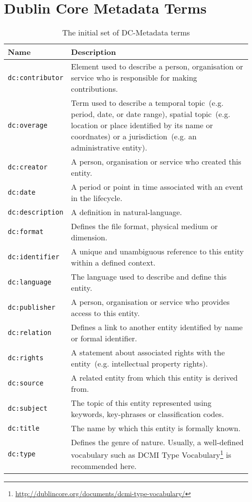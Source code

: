 \appendix
\chapter{Dublin Core Metadata Terms}\label{app:dc_terms}
\begingroup
\renewcommand{\arraystretch}{2}
\begin{table}
	\begin{tabularx}{\textwidth}{l|X}
		\textbf{Name} & \textbf{Description} \\
		\hline
		\texttt{dc:contributor} & Element used to describe a person, organisation or service who is responsible for making contributions.\\
		\texttt{dc:overage} & Term used to describe a temporal topic~(e.g. period, date, or date range), spatial topic~(e.g. location or place identified by its name or coordnates) or a jurisdiction~(e.g. an administrative entity). \\
		\texttt{dc:creator} & A person, organisation or service who created this entity.\\
		\texttt{dc:date} & A period or point in time associated with an event in the lifecycle.\\
		\texttt{dc:description} & A definition in natural-language.\\
		\texttt{dc:format} & Defines the file format, physical medium or dimension.\\
		\texttt{dc:identifier} & A unique and unambiguous reference to this entity within a defined context.\\
		\texttt{dc:language} & The language used to describe and define this entity.\\
		\texttt{dc:publisher} & A person, organisation or service who provides access to this entity.\\
		\texttt{dc:relation} & Defines a link to another entity identified by name or formal identifier.\\
		\texttt{dc:rights} & A statement about associated rights with the entity~(e.g. intellectual property rights).\\
		\texttt{dc:source} & A related entity from which this entity is derived from.\\
		\texttt{dc:subject} & The topic of this entity represented using keywords, key-phrases or classification codes.\\
		\texttt{dc:title} & The name by which this entity is formally known.\\
		\texttt{dc:type} & Defines the genre of nature. Usually, a well-defined vocabulary such as DCMI Type Vocabulary\footnote{\url{http://dublincore.org/documents/dcmi-type-vocabulary/}} is recommended here.\\
	\end{tabularx}
	\caption{The initial set of DC-Metadata terms}
\end{table}
\endgroup

